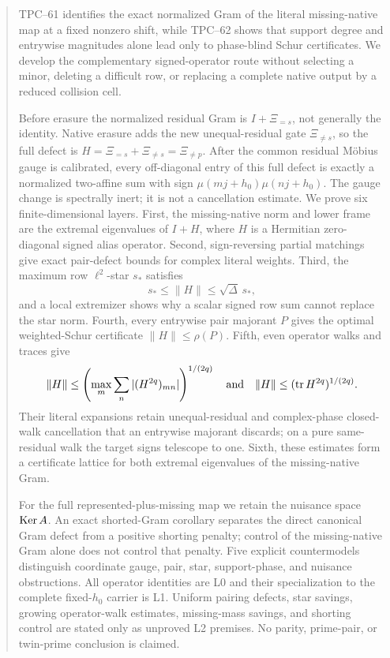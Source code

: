 \begin{abstract}
TPC--61 identifies the exact normalized Gram of the literal missing-native
map at a fixed nonzero shift, while TPC--62 shows that support degree and
entrywise magnitudes alone lead only to phase-blind Schur certificates.  We
develop the complementary signed-operator route without selecting a minor,
deleting a difficult row, or replacing a complete native output by a
reduced collision cell.

Before erasure the normalized residual Gram is
\(I+\Xi_{=s}\), not generally the identity.  Native erasure adds the new
unequal-residual gate \(\Xi_{\ne s}\), so the full defect is
\(H=\Xi_{=s}+\Xi_{\ne s}=\Xi_{\ne p}\).  After the common residual
M\"obius gauge is calibrated, every off-diagonal entry of this full defect
is exactly a normalized two-affine sum with sign
\(\mu(mj+h_0)\mu(nj+h_0)\).  The gauge change is spectrally inert; it is
not a cancellation estimate.  We prove six finite-dimensional layers.
First, the missing-native norm and lower frame are the extremal eigenvalues
of \(I+H\), where \(H\) is a Hermitian zero-diagonal signed alias operator.
Second, sign-reversing partial matchings give exact pair-defect bounds for
complex literal weights.  Third, the maximum row \(\ell^2\)-star \(s_*\)
satisfies
\[
 s_*\le\|H\|\le\sqrt{\Delta}\,s_*,
\]
and a local extremizer shows why a scalar signed row sum cannot replace the
star norm.  Fourth, every entrywise pair majorant \(P\) gives the optimal
weighted-Schur certificate \(\|H\|\le\rho(P)\).  Fifth, even operator
walks and traces give
\[
 \|H\|\le
 \left(\max_m\sum_n|(H^{2q})_{mn}|\right)^{1/(2q)}
 \quad\text{and}\quad
 \|H\|\le(\tr H^{2q})^{1/(2q)}.
\]
Their literal expansions retain unequal-residual and complex-phase
closed-walk cancellation that an entrywise majorant discards; on a pure
same-residual walk the target signs telescope to one.  Sixth, these
estimates form a certificate lattice for both extremal eigenvalues of the
missing-native Gram.

For the full represented-plus-missing map we retain the nuisance space
\(\Ker A\).  An exact shorted-Gram corollary separates the direct
canonical Gram defect from a positive shorting penalty; control of the
missing-native Gram alone does not control that penalty.  Five explicit
countermodels distinguish coordinate gauge, pair, star, support-phase, and
nuisance obstructions.  All operator identities are L0 and their
specialization to the complete fixed-\(h_0\) carrier is L1.  Uniform
pairing defects, star savings, growing operator-walk estimates, missing-mass
savings, and shorting control are stated only as unproved L2 premises.  No
parity, prime-pair, or twin-prime conclusion is claimed.
\end{abstract}
